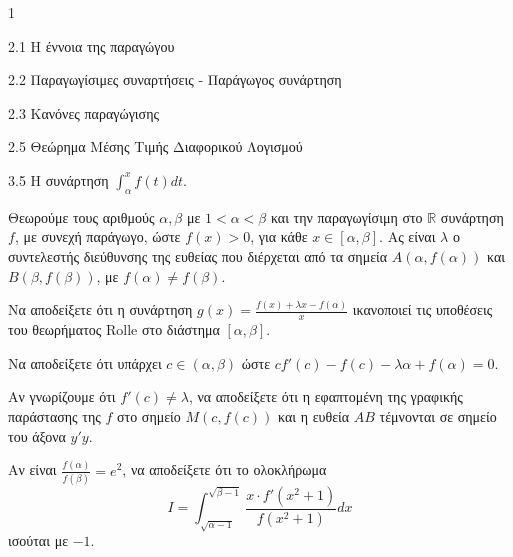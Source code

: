 \begin{ylh}{1}
    \item 2.1 Η έννοια της παραγώγου
    \item 2.2 Παραγωγίσιμες συναρτήσεις - Παράγωγος συνάρτηση
    \item 2.3 Κανόνες παραγώγισης
    \item 2.5 Θεώρημα Μέσης Τιμής Διαφορικού Λογισμού
    \item 3.5 Η συνάρτηση $\int_{\alpha}^{x} f(t) dt$.
\end{ylh}
Θεωρούμε τους αριθμούς $\alpha, \beta$ με $1 < \alpha < \beta$ και την παραγωγίσιμη στο $\mathbb{R}$ συνάρτηση $f$, με συνεχή παράγωγο, ώστε $f(x) > 0$, για κάθε $x \in [\alpha, \beta]$. Ας είναι $\lambda$ ο συντελεστής διεύθυνσης της ευθείας που διέρχεται από τα σημεία $A(\alpha, f(\alpha))$ και $B(\beta, f(\beta))$, με $f(\alpha) \neq f(\beta)$.

\begin{alist}
\item Να αποδείξετε ότι η συνάρτηση $g(x) = \frac{f(x)+\lambda x-f(\alpha)}{x}$ ικανοποιεί τις υποθέσεις του θεωρήματος Rolle στο διάστημα $[\alpha, \beta]$. 
\item Να αποδείξετε ότι υπάρχει $c \in (\alpha, \beta)$ ώστε $cf'(c) - f(c) - \lambda \alpha + f(\alpha) = 0$. 
\item Αν γνωρίζουμε ότι $f'(c) \neq \lambda$, να αποδείξετε ότι η εφαπτομένη της γραφικής παράστασης της $f$ στο σημείο $M(c, f(c))$ και η ευθεία $AB$ τέμνονται σε σημείο του άξονα $y'y$. 
\item Αν είναι $\frac{f(\alpha)}{f(\beta)} = e^2$, να αποδείξετε ότι το ολοκλήρωμα
\[ I = \int_{\sqrt{\alpha-1}}^{\sqrt{\beta-1}} \frac{x \cdot f'(x^2 + 1)}{f(x^2 + 1)} dx \]
ισούται με $-1$. 
\end{alist}